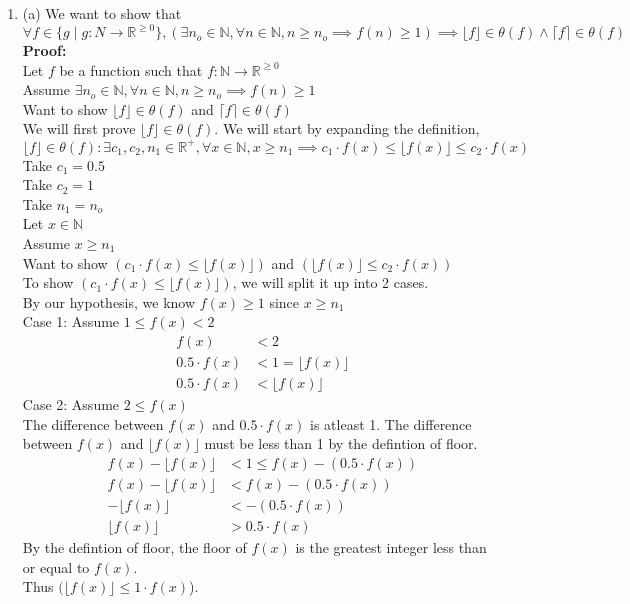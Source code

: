 \documentclass{article}
\newcommand{\floor}[1]{\lfloor #1 \rfloor}
\newcommand{\ceil}[1]{\lceil #1 \rceil}
\newcommand{\R}{\mathbb{R}}
\newcommand{\N}{\mathbb{N}}
\begin{document}
\begin{enumerate}
	\item  (a) We want to show that $$\forall f \in \{g \mid g:N \to \R^{\geq 0}\}, (\exists n_o \in \N, \forall n \in \N, n \geq n_o \implies f(n) \geq 1)\implies \floor f \in \theta (f)\wedge \ceil f \in \theta (f)$$
	\textbf{Proof:} \\
	Let $f$ be a function such that $f: \N \to \R^{\geq 0}$\\
	Assume $\exists n_o \in \N, \forall n \in \N, n \geq n_o \implies f(n) \geq 1$\\
	Want to show $\floor f \in \theta (f)$ and $\ceil f \in \theta (f)$\\
	
	We will first prove  $\floor f \in \theta (f)$. We will start by expanding the definition,
	 $$\floor f \in \theta (f) : \exists c_1, c_2, n_1 \in \R^+, \forall x \in \N, x \geq n_1 \implies c_1 \cdot f(x) \leq \floor {f(x)} \leq c_2 \cdot f(x)$$
	 Take $c_1 = 0.5$\\
	 Take $c_2 = 1$\\
	 Take $n_1 = n_o$\\
	 Let $x \in \N$\\
	 Assume $x \geq n_1$\\
	 Want to show $(c_1 \cdot f(x) \leq \floor {f(x)})$ and $(\floor {f(x)}  \leq c_2 \cdot f(x))$\\
	 
	 To show $(c_1 \cdot f(x) \leq \floor {f(x)})$, we will split it up into 2 cases.\\
	 By our hypothesis, we know $f(x) \geq 1$ since $x \geq n_1$\\
	 Case 1: Assume $1 \leq f(x) < 2$
	\begin{align*}
	f(x) &< 2\\
	0.5 \cdot f(x) &< 1 = \floor {f(x)}\\
	0.5 \cdot f(x) &< \floor {f(x)}
	\end{align*} 
	Case 2: Assume $2 \leq f(x)$\\
	The difference between $f(x)$ and $0.5 \cdot f(x)$ is atleast 1. The difference between $f(x)$ and $\floor {f(x)}$ must be less than 1 by the defintion of floor.
	\begin{align*}
	f(x) - \floor {f(x)} &< 1 \leq  f(x) - (0.5 \cdot f(x))\\
	f(x) - \floor {f(x)} &< f(x) - (0.5 \cdot f(x))\\
	- \floor {f(x)} &< - (0.5 \cdot f(x))\\
	\floor {f(x)} &> 0.5 \cdot f(x)
	\end{align*} 
	 By the defintion of floor, the floor of $f(x)$ is the greatest integer less than or equal to $f(x)$.\\
	 Thus $(\floor {f(x)}  \leq 1 \cdot f(x)$).\\
	 

\end{enumerate}
\end{document}
